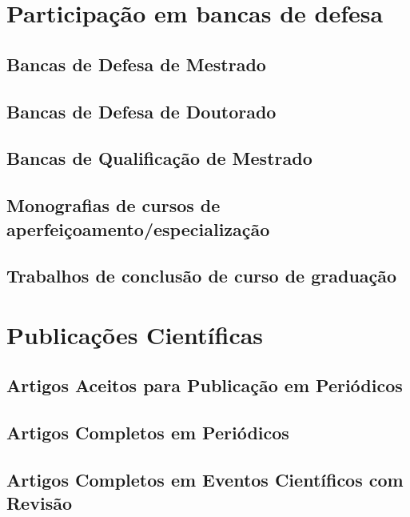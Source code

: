 

\section{Participação em bancas de defesa}

\subsection{Bancas de Defesa de Mestrado}

\subsection{Bancas de Defesa de Doutorado}

\subsection{Bancas de Qualificação de Mestrado}

\subsection{Monografias de cursos de aperfeiçoamento/especialização}

\subsection{Trabalhos de conclusão de curso de graduação}


\section{Publicações Científicas}

\subsection{Artigos Aceitos para Publicação em Periódicos}

\subsection{Artigos Completos em Periódicos}




\subsection{Artigos Completos em Eventos Científicos com Revisão}

